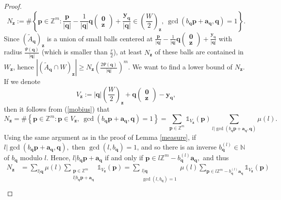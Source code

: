\documentclass[reqno]{amsart}
\theoremstyle{definition}
\theoremstyle{remark}
\begin{document}
\begin{proof}
    $$N_\mathbf{z}:=\#\left\{\mathbf p \in \mathbb Z^m : \frac{\mathbf p}{|\mathbf q|} - \frac{1}{|\mathbf{q}|} \mathbf q \begin{pmatrix} \mathbf{0} \\ \mathbf{z} \end{pmatrix} + \frac{\mathbf y_\mathbf q}{|\mathbf q|} \in \left(\frac{W}{2}\right)_{\!\!\mathbf{z}} , \ \gcd(b_\mathbf q \mathbf p +\mathbf a_\mathbf q, \mathbf q) = 1 \right\}.$$
    Since $(\tilde{A}_\mathbf{q})_\mathbf{z}$ is a union of small balls centered at $\frac{\mathbf p}{|\mathbf q|} - \frac{1}{|\mathbf{q}|} \mathbf q {\scriptstyle \begin{pmatrix} \mathbf{0} \\ \mathbf{z} \end{pmatrix}} + \frac{\mathbf y_\mathbf q}{|\mathbf q|}$ with radius $\frac{\Psi(\mathbf{q})}{|\mathbf{q}|}$ (which is smaller than $\frac{r}{2}$), at least $N_\mathbf{z}$ of these balls are contained in $W_\mathbf{z}$, hence $|(\tilde A_\mathbf q \cap W)_\mathbf z| \geq N_\mathbf{z} \left(\frac{2\Psi(\mathbf q)}{|\mathbf q|}\right)^m.$ We want to find a lower bound of $N_\mathbf{z}$. If we denote 
    $$V_\mathbf{z} := |\mathbf q| \left(\frac{W}{2}\right)_{\!\!\mathbf{z}} + \mathbf q \begin{pmatrix} \mathbf{0} \\ \mathbf{z} \end{pmatrix} -\mathbf y_\mathbf q,$$
    then it follows from (\ref{mobius}) that
        $$N_\mathbf{z} = \#\left\{\mathbf p \in \mathbb Z^m : \mathbf p \in  V_\mathbf{z}, \ \gcd(b_\mathbf q \mathbf p +\mathbf a_\mathbf q, \mathbf q) = 1 \right\} = \sum_{\mathbf{p} \in \mathbb{Z}^m} \mathds{1}_{V_\mathbf{z}} (\mathbf{p}) \!\!\!\! \sum_{l | \gcd(b_\mathbf q \mathbf p +\mathbf a_\mathbf q, \mathbf q)} \!\!\!\! \mu(l).$$
    Using the same argument as in the proof of Lemma \ref{measure}, if $l | \gcd(b_\mathbf{q} \mathbf{p} + \mathbf{a}_\mathbf{q}, \mathbf{q}),$ then $\gcd(l, b_\mathbf{q}) = 1$, and so there is an inverse $b_\mathbf{q}^{(l)} \in \mathbb{N}$ of $b_\mathbf{q}$ modulo $l$. Hence, $l|b_\mathbf{q}\mathbf{p}+\mathbf{a}_\mathbf{q}$ if and only if $\mathbf{p} \in l\mathbb{Z}^m - b_\mathbf{q}^{(l)}\mathbf{a}_\mathbf{q},$ and thus
    \begin{align*}
        N_\mathbf{z} &= \sum_{l | \mathbf{q}} \mu(l) \sum_{\substack{\mathbf{p} \in \mathbb{Z}^m \\ l| b_\mathbf{q} \mathbf{p} + \mathbf{a}_\mathbf{q}}} \!\!\! \mathds{1}_{V_\mathbf{z}}(\mathbf{p}) = \!\!\!\! \sum_{\substack{l|\mathbf{q} \\ \gcd(l,b_\mathbf{q})=1}} \!\!\!\! \mu(l) \!\!\!\! \sum_{\mathbf{p} \in l\mathbb{Z}^m - b_\mathbf{q}^{(l)}\mathbf{a}_\mathbf{q}} \!\!\!\! \mathds{1}_{V_\mathbf{z}}(\mathbf{p}) \\

\end{align*}
\end{proof}
\end{document}
